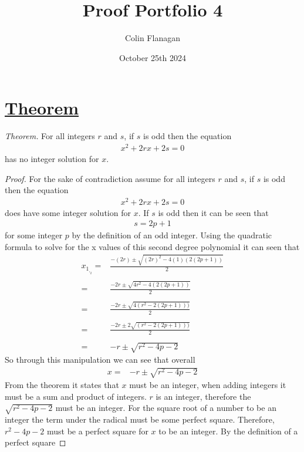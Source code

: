 \documentclass{article}
\title{Proof Portfolio 4}
\author{Colin Flanagan}
\date{October 25th 2024}
\begin{document}
\maketitle

\section*{\underline{Theorem}} 

\textit{Theorem.} For all integers $r$ and $s$, if $s$ is odd then the equation
\begin{align*}
    x^2 + 2rx + 2s = 0
\end{align*}
has no integer solution for $x$.
    \begin{proof}
     For the sake of contradiction assume for all integers $r$ and $s$, if $s$ is odd then the equation 
     \begin{align*}
    x^2 + 2rx + 2s = 0
\end{align*}
does have some integer solution for $x$. If $s$ is odd then it can be seen that 
\begin{align*}
    s = 2p+1
\end{align*}
for some integer $p$ by the definition of an odd integer. Using the quadratic formula to solve for the x values of this second degree polynomial it can seen that
\begin{align*}
    x_1_,_2 =&  \frac{-(2r) \pm \sqrt{(2r)^2 - 4(1)(2(2p+1))}}{2}\\
    \\
     =&  \frac{-2r \pm \sqrt{4r^2 - 4(2(2p+1))}}{2}\\
     \\
     =&  \frac{-2r \pm \sqrt{4(r^2 - 2(2p+1)))}}{2}\\
     \\
     =&  \frac{-2r \pm 2\sqrt{(r^2 - 2(2p+1)))}}{2}\\
     \\
     =& -r \pm \sqrt{r^2-4p-2}
\end{align*}
So through this manipulation we can see that overall
\begin{align*}
    x =& -r \pm \sqrt{r^2-4p -2}
\end{align*}
From the theorem it states that $x$ must be an integer, when adding integers it must be a sum and product of integers. $r$ is an integer, therefore the $\sqrt{r^2 - 4p -2}$ must be an integer. For the square root of a number to be an integer the term under the radical must be some perfect square. Therefore, $r^2 - 4p - 2$ must be a perfect square for $x$ to be an integer. By the definition of a perfect square

\end{proof}
\end{document}
